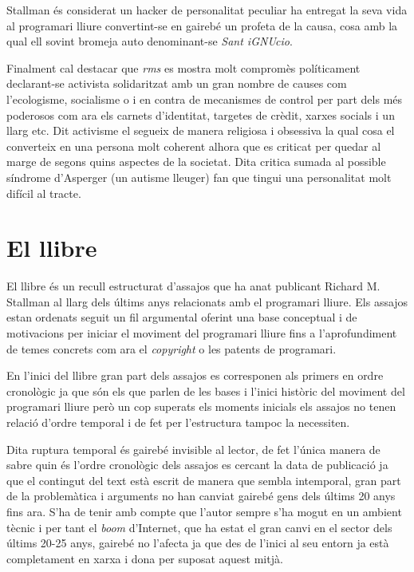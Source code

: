 \documentclass[a4paper,10pt]{scrartcl}
\begin{document}
  Stallman és considerat un hacker de personalitat peculiar
ha entregat la seva vida al programari lliure convertint-se en gairebé un profeta de la causa,
cosa amb la qual ell sovint bromeja auto denominant-se \emph{Sant iGNUcio}.

  Finalment cal destacar que \emph{rms} es mostra molt compromès políticament declarant-se activista
solidaritzat amb un gran nombre de causes com l'ecologisme, socialisme o i en contra de mecanismes
de control per part dels més poderosos com ara els carnets d'identitat,
targetes de crèdit, xarxes socials i un llarg etc. Dit activisme el segueix de manera religiosa
i obsessiva la qual cosa el converteix en una persona molt coherent alhora que es criticat
per quedar al marge de segons quins aspectes de la societat. Dita critica sumada
al possible síndrome d'Asperger (un autisme lleuger) fan que tingui una personalitat molt
difícil al tracte.


\section{El llibre}

  El llibre és un recull estructurat d'assajos que ha anat publicant Richard M. Stallman
al llarg dels últims anys relacionats amb el programari lliure. Els assajos estan ordenats
seguit un fil argumental oferint una base conceptual i de motivacions per iniciar el moviment
del programari lliure fins a l'aprofundiment de temes concrets com ara el \emph{copyright} o
les patents de programari.

  En l'inici del llibre gran part dels assajos es corresponen
als primers en ordre cronològic ja que són els que parlen de les bases i l'inici històric
del moviment del programari lliure però un cop superats els moments inicials els assajos
no tenen relació d'ordre temporal i de fet per l'estructura tampoc la necessiten.

  Dita ruptura temporal és gairebé invisible al lector, de fet l'única manera de sabre
quin és l'ordre cronològic dels assajos es cercant la data de publicació ja que el
contingut del text està escrit de manera que sembla intemporal, gran part de la
problemàtica i arguments no han canviat gairebé gens dels últims 20 anys fins ara.
S'ha de tenir amb compte que l'autor sempre s'ha mogut en un ambient tècnic i per
tant el \emph{boom} d'Internet, que ha estat el gran canvi en el sector dels últims 20-25
anys, gairebé no l'afecta ja que des de l'inici al seu entorn ja està completament
en xarxa i dona per suposat aquest mitjà.
\end{document}
